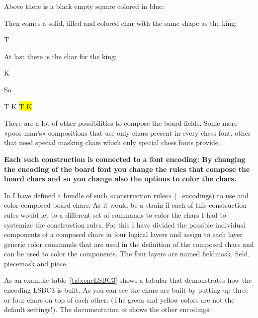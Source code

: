 \documentclass[pagesize,parskip=half-,fontsize=12pt]{scrartcl}
\newcommand\Chess[1][1cm]{\boardfont\fontsize{#1}{#1}\setboardfontsize{#1}\selectfont}
\newcommand\Plus{\raisebox{0.5ex}{\normalfont\fontsize{1.5ex}{1.5ex}\bfseries\,+\,}}
\newcommand\Equal{\raisebox{0.5ex}{\normalfont\fontsize{1.5ex}{1.5ex}\bfseries\,=\,}}
\begin{document}
\colorbox{yellow}{\Chess\phantom{\BlackEmptySquare}}

Above there is a black empty square colored in blue:

{\Chess\color{blue}\BlackEmptySquare}

Then comes a solid, filled and colored char with the same shape as
the king:

{\Chess\color{green}T}

At last there is the char for the king:

{\Chess\color{red}K}

So

{\Chess\colorbox{yellow}{\phantom{\BlackEmptySquare}}\Plus
 {\color{blue}\BlackEmptySquare}\Plus
 {\color{green}T\phantom{\BlackEmptySquare}}\Plus
 {\color{red}K}\Equal
 \colorbox{yellow}{%
 \makebox[0pt][l]{\color{blue}\BlackEmptySquare}%
 \color{green}T%
 \color{red}K}}


There are a lot of other possibilities to compose the board fields.
Some more «poor man's» compositions that use only chars present in
every chess font, other that need special masking chars which only
special chess fonts provide.

{\bfseries Each such construction is connected to a font encoding: By
changing the encoding of the board font you change the rules that
compose the board chars and so you change also the options to color
the chars.}


In \chessfss I have defined a bundle of such «construction rules»
(=encodings) to use and color composed board chars. As it would be a
strain if each of this construction rules would let to a different
set of commands to color the chars I had to systemize the
construction rules. For this I have divided the possible individual
components of a composed chars in four logical layers and assign to
each layer generic color commands that are used in the definition of
the composed chars and can be used to color the components. The four
layers are named fieldmask, field, piecemask and piece.

As an example table~\ref{tab:encLSBC3} shows a tabular that
demonstrates how the encoding LSBC3 is built. As you can see the
chars are built by putting up three or four chars on top of each
other. (The green and yellow colors are not the default settings!).
The documentation of
\chessfss shows the other encodings.
\end{document}
